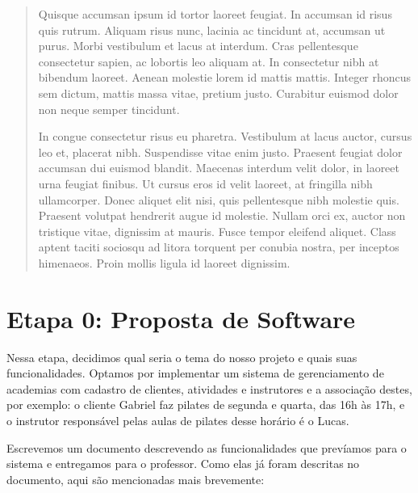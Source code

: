 \documentclass[11pt,twoside]{article}
\begin{document}
\begin{abstract}
Quisque accumsan ipsum id tortor laoreet feugiat. In accumsan id risus quis rutrum. Aliquam risus nunc, lacinia ac tincidunt at, accumsan ut purus. Morbi vestibulum et lacus at interdum. Cras pellentesque consectetur sapien, ac lobortis leo aliquam at. In consectetur nibh at bibendum laoreet. Aenean molestie lorem id mattis mattis. Integer rhoncus sem dictum, mattis massa vitae, pretium justo. Curabitur euismod dolor non neque semper tincidunt.

In congue consectetur risus eu pharetra. Vestibulum at lacus auctor, cursus leo et, placerat nibh. Suspendisse vitae enim justo. Praesent feugiat dolor accumsan dui euismod blandit. Maecenas interdum velit dolor, in laoreet urna feugiat finibus. Ut cursus eros id velit laoreet, at fringilla nibh ullamcorper. Donec aliquet elit nisi, quis pellentesque nibh molestie quis. Praesent volutpat hendrerit augue id molestie. Nullam orci ex, auctor non tristique vitae, dignissim at mauris. Fusce tempor eleifend aliquet. Class aptent taciti sociosqu ad litora torquent per conubia nostra, per inceptos himenaeos. Proin mollis ligula id laoreet dignissim.
\end{abstract}

\clearpage
\tableofcontents

\clearpage

\section{Etapa 0: Proposta de Software}
Nessa etapa, decidimos qual seria o tema do nosso projeto e quais suas funcionalidades.
Optamos por implementar um sistema de gerenciamento de academias com cadastro de clientes, atividades
e instrutores e a associação destes, por exemplo: o cliente Gabriel faz pilates
de segunda e quarta, das 16h às 17h, e o instrutor responsável pelas aulas de pilates desse horário é o Lucas.

Escrevemos um documento descrevendo as funcionalidades que prevíamos para o sistema e entregamos para o professor.
Como elas já foram descritas no documento, aqui são mencionadas mais brevemente:
\end{document}

